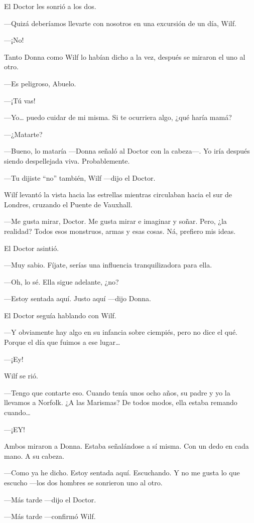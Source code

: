 El Doctor les sonrió a los dos.

---Quizá deberíamos llevarte con nosotros en una excursión de un día,
Wilf.

---¡No!

Tanto Donna como Wilf lo habían dicho a la vez, después se miraron el
uno al otro.

---Es peligroso, Abuelo.

---¡Tú vas!

---Yo\ldots{} puedo cuidar de mi misma. Si te ocurriera algo, ¿qué haría
mamá?

---¿Matarte?

---Bueno, lo mataría ---Donna señaló al Doctor con la cabeza---. Yo iría
después siendo despellejada viva. Probablemente.

---Tu dijiste ``no'' también, Wilf ---dijo el Doctor.

Wilf levantó la vista hacia las estrellas mientras circulaban hacia el
sur de Londres, cruzando el Puente de Vauxhall.

---Me gusta mirar, Doctor. Me gusta mirar e imaginar y soñar. Pero, ¿la
realidad? Todos esos monstruos, armas y esas cosas. Ná, prefiero mis
ideas.

El Doctor asintió.

---Muy sabio. Fíjate, serías una influencia tranquilizadora para ella.

---Oh, lo sé. Ella sigue adelante, ¿no?

---Estoy sentada aquí. Justo aquí ---dijo Donna.

El Doctor seguía hablando con Wilf.

---Y obviamente hay algo en su infancia sobre ciempiés, pero no dice el
qué. Porque el día que fuimos a ese lugar\ldots{}

---¡Ey!

Wilf se rió.

---Tengo que contarte eso. Cuando tenía unos ocho años, su padre y yo la
llevamos a Norfolk. ¿A las Marismas? De todos modos, ella estaba
remando cuando\ldots{}

---¡EY!

Ambos miraron a Donna. Estaba señalándose a sí misma. Con un dedo en
cada mano. A su cabeza.

---Como ya he dicho. Estoy sentada aquí. Escuchando. Y no me gusta lo
que escucho ---los dos hombres se sonrieron uno al otro.

---Más tarde ---dijo el Doctor.

---Más tarde ---confirmó Wilf.

